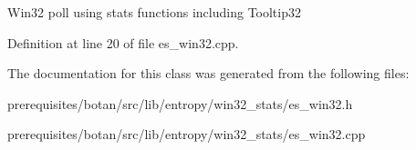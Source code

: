 Win32 poll using stats functions including Tooltip32 

Definition at line 20 of file es\+\_\+win32.\+cpp.



The documentation for this class was generated from the following files\+:\begin{DoxyCompactItemize}
\item 
prerequisites/botan/src/lib/entropy/win32\+\_\+stats/es\+\_\+win32.\+h\item 
prerequisites/botan/src/lib/entropy/win32\+\_\+stats/es\+\_\+win32.\+cpp\end{DoxyCompactItemize}
